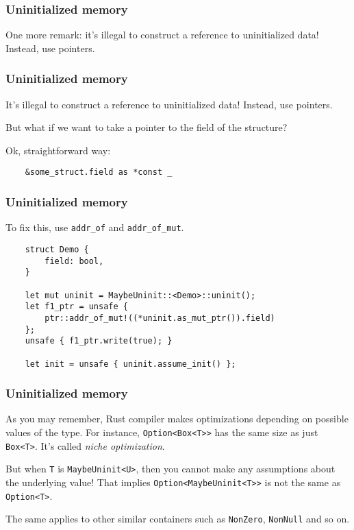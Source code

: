 \documentclass[aspectratio=1610,t]{beamer}
\begin{document}

\begin{frame}[fragile]
\frametitle{Uninitialized memory}
One more remark: it's illegal to construct a reference to uninitialized data! Instead, use pointers.

\end{frame}


\begin{frame}[fragile]
\frametitle{Uninitialized memory}
It's illegal to construct a reference to uninitialized data! Instead, use pointers.

But what if we want to take a pointer to the field of the structure?

Ok, straightforward way:

\begin{verbatim}
    &some_struct.field as *const _
\end{verbatim}

\end{frame}


\begin{frame}[fragile]
\frametitle{Uninitialized memory}
To fix this, use \texttt{addr\_of} and \texttt{addr\_of\_mut}.

\begin{verbatim}
    struct Demo {
        field: bool,
    }

    let mut uninit = MaybeUninit::<Demo>::uninit();
    let f1_ptr = unsafe {
        ptr::addr_of_mut!((*uninit.as_mut_ptr()).field)
    };
    unsafe { f1_ptr.write(true); }

    let init = unsafe { uninit.assume_init() };
\end{verbatim}
\end{frame}


\begin{frame}[fragile]
\frametitle{Uninitialized memory}
As you may remember, Rust compiler makes optimizations depending on possible values of the type. For instance, \texttt{Option<Box<T>>} has the same size as just \texttt{Box<T>}. It's called \textit{niche optimization}.

But when \texttt{T} is \texttt{MaybeUninit<U>}, then you cannot make any assumptions about the underlying value! That implies \texttt{Option<MaybeUninit<T>>} is not the same as \texttt{Option<T>}.

The same applies to other similar containers such as \texttt{NonZero}, \texttt{NonNull} and so on.
\end{frame}
\end{document}

